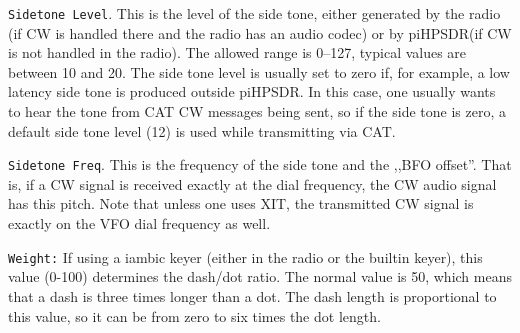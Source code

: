 \documentclass[12pt]{book}
\def\rett#1{\texttt{\color{red}#1}}
\def\pH{pi\-HPSDR\xspace}
\begin{document}
\rett{Sidetone Level}. This is the level of the side tone,
either generated by the radio (if CW is handled there and the radio
has an audio codec) or
by \pH (if CW is not handled in the radio). The allowed range
is 0--127, typical values are between 10 and 20. The side tone level
is usually set to zero if, for example, a low latency side tone is
produced outside \pH. In this case, one usually wants to hear
the tone from CAT CW messages being sent, so if the side tone is
zero, a default side tone level (12) is used while transmitting
via CAT.

\rett{Sidetone Freq}. This is the frequency of the side tone and the
,,BFO offset''. That is, if a CW signal is received exactly at the
dial frequency, the CW audio signal has this pitch. Note that unless
one uses XIT, the transmitted CW signal is exactly on the VFO dial
frequency as well.

\rett{Weight:} If using a iambic keyer (either in the radio or
the builtin keyer), this value (0-100) determines the dash/dot ratio.
The normal value is 50, which means that a dash is three times longer
than a dot. The dash length is proportional to this value, so it can
be from zero to six times the dot length.

%
\end{document}
